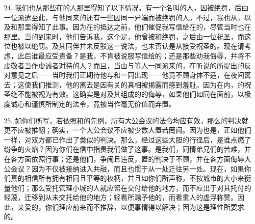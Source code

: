 24. 我们也从那些在的人那里得知了以下情况。有一个名叫的人，因被绝罚，后由一位派遣至此，与他同来的还有一些因同一异端而被绝罚的人。不过，我也从，以及和那里得知了此事。因为在的抵达之前，他们催促我写信给在的，尽管当时也在那里。当的到来时，他们告诉我，这个是，他曾被和绝罚，之后由一位祝圣，而这位也被以绝罚。及其同伴并未反驳这一说法，也未否认是从接受祝圣的。现在请考虑，此后谁最应受责备？是我，不肯被说服写信给的；还是那些劝我侮辱，并将不虔敬者当作虔诚者对待的人？而且，当由与等人一同派来的，在听说的所提出的反对意见之后——当时我们正期待他与和一同出现——他竟不顾身体不适，在夜间离去；这使我们推测，他的离去是因有关的真相被揭露而感到羞耻。因为在内，的祝圣绝不能被视为有效。这确实是对及其组成的的侮辱，如果他们如同在面前，以极度诚心和谨慎所制定的法令，竟被当作毫无价值而弃置。\par

25. 如你们所写，若依照和的先例，所有大公会议的法令均应有效，那么的判决就更不应被推翻；确实，一个大公会议不应被少数人置若罔闻。因为也是，正如他们一样，对双方都已作出了类似的判决。那么，经过这些大胆的行径后，是谁点燃了纷争的火焰？因为你们在信中指责我们做了这事。是我们，同情弟兄们的苦难，并在各方面依照行事；还是他们，争闹且违反，置的判决于不顾，并在各方面侮辱大公会议？因为不仅被接纳进入共融，而且也惯于从一处迁往另一处。现在，如果你们真的相信所有拥有相同且平等的权柄，并且如你们所声称，不按城市的大小来衡量他们；那么受托管理小城的人就应留在交付给他的地方，而不应出于对其托付的轻蔑，迁移到从未交托给他的地方；轻看所赐予他的，而看重人的虚浮称赞。因此，亲爱的，你们理应前来而不推辞，以便事情得以解决；因为这是理性所要求的。\par

